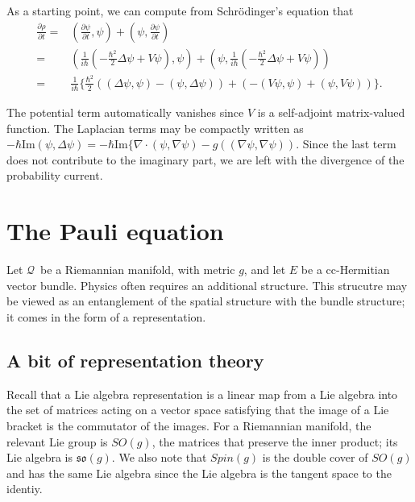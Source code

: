 \documentclass[11pt]{article}
\theoremstyle{remark}
\begin{document}
As a starting point, we can compute from Schr\"odinger's equation that
\[
\begin{split}
\ensuremath{\frac{\partial {\ensuremath{\rho}}}{\partial {t}}} =& \ensuremath{({\ensuremath{\frac{\partial {\ensuremath{\psi}}}{\partial {t}}}}, {\ensuremath{\psi}})} +
\ensuremath{({\ensuremath{\psi}}, {\ensuremath{\frac{\partial {\ensuremath{\psi}}}{\partial {t}}}})} 
\\  = & 
\ensuremath{({\frac{1}{i\ensuremath{\hbar}}(-\frac{\ensuremath{\hbar}^2}{2} \ensuremath{\Delta} \ensuremath{\psi} + V \ensuremath{\psi})}, {\ensuremath{\psi}})} +   
\ensuremath{({\ensuremath{\psi}}, {\frac{1}{i\ensuremath{\hbar}}(-\frac{\ensuremath{\hbar}^2}{2} \ensuremath{\Delta} \ensuremath{\psi} + V \ensuremath{\psi})})}
\\ = &
 \frac{1}{i\ensuremath{\hbar}} \{\frac{\ensuremath{\hbar}^2}{2}(\ensuremath{({\ensuremath{\Delta} \ensuremath{\psi}}, {\ensuremath{\psi}})} - \ensuremath{({\ensuremath{\psi}}, {\ensuremath{\Delta}
 \ensuremath{\psi}})}) + (-\ensuremath{({V \ensuremath{\psi}}, {\ensuremath{\psi}})} + \ensuremath{({\ensuremath{\psi}}, {V \ensuremath{\psi}})})\}.
\end{split}
\]

The potential term automatically vanishes since $V$ is
a self-adjoint matrix-valued function. 
The Laplacian terms may be compactly written as
 $-\ensuremath{\hbar} \textrm{Im} \ensuremath{({\ensuremath{\psi}}, {\ensuremath{\Delta}
\ensuremath{\psi}})} = -\ensuremath{\hbar} \textrm{Im}\{\nabla \cdot \ensuremath{({\ensuremath{\psi}}, {\nabla \ensuremath{\psi}})} - g(\ensuremath{({\nabla
  \ensuremath{\psi}}, {\nabla \ensuremath{\psi}})}) $. Since the last term does not contribute to the
imaginary part, we are  left with the divergence of the probability
current.  


\section{The Pauli equation}


Let \ensuremath{\mathcal{Q}}\  be a Riemannian manifold, with metric $g$, and let $E$
be a cc-Hermitian vector bundle. Physics often requires an additional
structure. This strucutre may be viewed as an entanglement of the
spatial structure with the bundle structure; it comes in the form of a
representation. 

\subsection{A bit of representation theory}
Recall that  a Lie algebra 
representation is a linear map from
a Lie algebra into the set of matrices acting on a vector space
satisfying that the image of a Lie bracket is the commutator of the
images. For a Riemannian manifold, the relevant Lie group is $SO(g)$,
the matrices that preserve the inner product; its 
 Lie algebra is $\ensuremath{\mathfrak{so}(g)}$. We also note that $Spin(g)$ is the
double cover of $SO(g)$ and has the same Lie algebra since the Lie
algebra is the tangent space to the identiy. 
\end{document}
